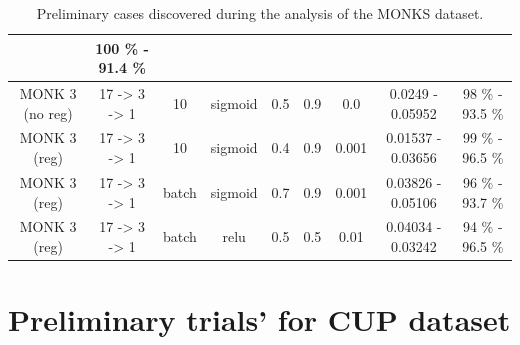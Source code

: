 \documentclass[11pt,twoside]{article}
\begin{document}
\begin{appendices}
\begin{table}[H]
\begin{subtable}{\textwidth}
{\begin{tabular}{| c | c | c | c | c | c | c | c | c |}
                    & 100 \% - 91.4 \% \\
                    \hline
                    MONK 3 (no reg) & 17 -> 3 -> 1 & 10 & sigmoid & 0.5 & 0.9 & 0.0 & 0.0249 - 0.05952
                    & 98 \% - 93.5 \% \\
                    \hline
                    MONK 3 (reg) & 17 -> 3 -> 1 & 10 & sigmoid & 0.4 & 0.9 & 0.001 & 0.01537 - 0.03656
                    & 99 \% - 96.5 \% \\
                    \hline
                    MONK 3 (reg) & 17 -> 3 -> 1 & batch & sigmoid & 0.7 & 0.9 & 0.001 & 0.03826 - 0.05106
                    & 96 \% - 93.7 \% \\
                    \hline
                    MONK 3 (reg) & 17 -> 3 -> 1 & batch & relu & 0.5 & 0.5 & 0.01 & 0.04034 - 0.03242
                    & 94 \% - 96.5 \% \\
                    \hline
                \end{tabular}
            }
        \end{subtable}
        \caption{Preliminary cases discovered during the analysis of the MONKS dataset.}
        \label{tab:monks_preliminary}
    \end{table}


    \section{Preliminary trials' for CUP dataset} %
    \label{sec:preliminary_trials_learning_curves_for_cup}


\end{appendices}

\end{document}
